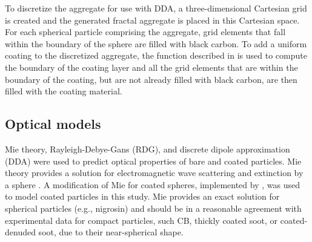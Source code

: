 To discretize the aggregate for use with DDA, a three-dimensional Cartesian grid is created and the generated fractal aggregate is placed in this Cartesian space. For each spherical particle comprising the aggregate, grid elements that fall within the boundary of the sphere are filled with black carbon. To add a uniform coating to the discretized aggregate, the function described in \citet{RN22} is used to compute the boundary of the coating layer and all the grid elements that are within the boundary of the coating, but are not already filled with black carbon, are then filled with the coating material.


\subsection{Optical models}

Mie theory, Rayleigh-Debye-Gans (RDG),  and discrete dipole approximation (DDA) were used to predict optical properties of bare and coated particles. Mie theory provides a solution for electromagnetic wave scattering and extinction by a sphere \citep{RN1}. A modification of Mie for coated spheres, implemented by \cite{RN19}, was used to model coated particles in this study. Mie provides an exact solution for spherical particles (e.g., nigrosin) and should be in a reasonable agreement with experimental data for compact particles, such CB, thickly coated soot, or coated-denuded soot, due to their near-spherical shape.

